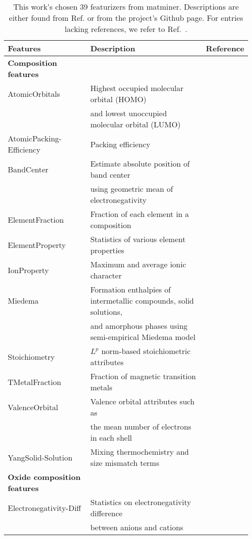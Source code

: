 \begin{center}
\begin{longtable}{M{3.5cm} M{6.5cm} M{2.0cm}}
\caption{This work's chosen 39 featurizers from matminer. Descriptions are either found from Ref. \cite{Ward2018} or from the project's Github page. For entries lacking references, we refer to Ref.~\cite{Ward2018}.}
\label{table:featurizers} 
\hline 
Features & Description & Reference \\ 
\hline 
  \textbf{Composition features} & & \\ 
  AtomicOrbitals & Highest occupied molecular orbital (HOMO) & \cite{Kotochigova1997}  \\   
   & and lowest unoccupied molecular orbital (LUMO) &  \\   
  AtomicPacking-Efficiency & Packing efficiency & \cite{Laws2015}  \\   
  BandCenter & Estimate absolute position of band center  & \cite{Butler1978} \\   
   & using geometric mean of electronegativity &  \\  
  ElementFraction & Fraction of each element in a composition &    \\   
  ElementProperty & Statistics of various element properties & \cite{Ong2013,Ward2016, Deml2016}  \\   
  IonProperty & Maximum and average ionic character & \cite{Ward2016} \\   
  Miedema & Formation enthalpies of intermetallic compounds, solid solutions, & \cite{Weeber1987} \\   
   & and amorphous phases using semi-empirical Miedema model &  \\   
  Stoichiometry & $L^p$ norm-based stoichiometric attributes & \cite{Ward2016} \\   
  TMetalFraction & Fraction of magnetic transition metals & \cite{Deml2016}  \\   
  ValenceOrbital & Valence orbital attributes such as & \cite{Ward2016}  \\   
   &  the mean number of electrons in each shell &   \\   
  YangSolid-Solution & Mixing thermochemistry and size mismatch terms & \cite{Yang2012} \\
    \hline 
  \textbf{Oxide composition features} &  &  \\
  Electronegativity-Diff & Statistics on electronegativity difference & \cite{Deml2016} \\   
   &  between anions and cations & \\ 

\end{longtable}
\end{center}
